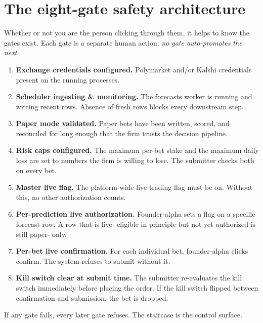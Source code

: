 \documentclass[11pt]{article}
\begin{document}
\section{The eight-gate safety architecture}

Whether or not you are the person clicking through them, it helps to
know the gates exist. Each gate is a separate human action;
\emph{no gate auto-promotes the next}.

\begin{enumerate}[leftmargin=*,itemsep=0.3em]
  \item \textbf{Exchange credentials configured.} Polymarket and/or
        Kalshi credentials present on the running processes.
  \item \textbf{Scheduler ingesting \& monitoring.} The forecasts
        worker is running and writing recent rows. Absence of fresh
        rows blocks every downstream step.
  \item \textbf{Paper mode validated.} Paper bets have been written,
        scored, and reconciled for long enough that the firm trusts
        the decision pipeline.
  \item \textbf{Risk caps configured.} The maximum per-bet stake and
        the maximum daily loss are set to numbers the firm is willing
        to lose. The submitter checks both on every bet.
  \item \textbf{Master live flag.} The platform-wide live-trading
        flag must be on. Without this, no other authorization counts.
  \item \textbf{Per-prediction live authorization.} Founder-alpha
        sets a flag on a specific forecast row. A row that is live-
        eligible in principle but not yet authorized is still paper-
        only.
  \item \textbf{Per-bet live confirmation.} For each individual bet,
        founder-alpha clicks confirm. The system refuses to submit
        without it.
  \item \textbf{Kill switch clear at submit time.} The submitter
        re-evaluates the kill switch immediately before placing the
        order. If the kill switch flipped between confirmation and
        submission, the bet is dropped.
\end{enumerate}

If any gate fails, every later gate refuses. The staircase is the
control surface.

\end{document}
